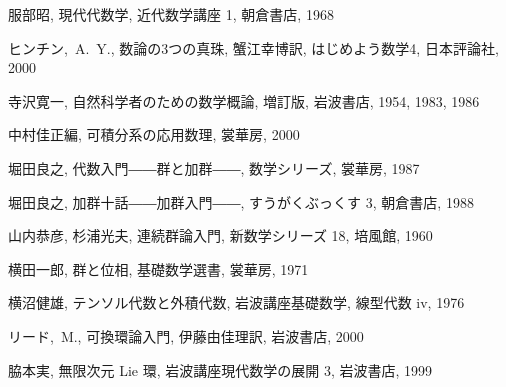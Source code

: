 \documentclass[12pt,twoside]{jarticle}
\begin{document}
\begin{thebibliography}{ABCD}
服部昭, 現代代数学, 近代数学講座 1, 朝倉書店, 1968

ヒンチン,~A.~Y., 数論の3つの真珠, 蟹江幸博訳, はじめよう数学4, 日本評論社, 
2000

寺沢寛一, 自然科学者のための数学概論, 増訂版, 岩波書店, 1954, 1983, 1986

中村佳正編, 可積分系の応用数理, 裳華房, 2000

堀田良之, 代数入門――群と加群――, 数学シリーズ, 裳華房, 1987

堀田良之, 加群十話――加群入門――, すうがくぶっくす 3, 朝倉書店, 1988

山内恭彦, 杉浦光夫, 連続群論入門, 新数学シリーズ 18, 培風館, 1960

横田一郎, 群と位相, 基礎数学選書, 裳華房, 1971

横沼健雄, テンソル代数と外積代数, 岩波講座基礎数学, 線型代数 iv, 1976

リード,~M., 可換環論入門, 伊藤由佳理訳, 岩波書店, 2000

脇本実, 無限次元 Lie 環, 岩波講座現代数学の展開 3, 岩波書店, 1999

\end{thebibliography}

\end{document}
